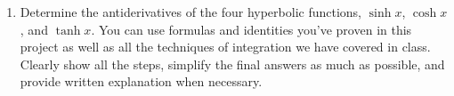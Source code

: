 \documentclass[12pt]{amsart}
\begin{document}
\begin{enumerate}
\begin{enumerate}
\smallskip
\item  Use the fact that $\sinh x$ and $\sinh^{-1} x$ are inverse functions to verify that $\sinh^{-1}x = \ln\left(x + \sqrt{x^2 + 1}\right)$.  To do this, you need to show that $\sinh(\sinh^{-1} x) = x$. There may be other ways to verify the equality, but I expect you to prove that $\sinh(\sinh^{-1} x) = x$.
\smallskip
\item  Take the derivative of $\sinh^{-1}x = \ln\left(x + \sqrt{x^2 + 1}\right)$, and show your work. Compare
your answer to what you got in part (b).
\end{enumerate}
\bigskip
\item  Determine the antiderivatives of the four hyperbolic functions, $\sinh x$, $\cosh x$, and $\tanh x$.  You can use formulas and identities you've proven in this project as well as all the techniques of integration we have covered in class.  Clearly show all the steps, simplify the final answers as much as possible, and provide written explanation when necessary.

\end{enumerate}
\end{document}
